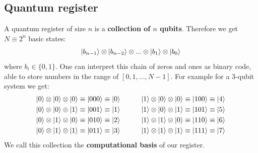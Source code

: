 \documentclass[bibliography=totocnumbered]{article}
\theoremstyle{NoticeStyle}
\begin{document}
\subsection{Quantum register}\label{sec:Quantum register}
A quantum register of size $n$ is a \textbf{collection of $n$ qubits}. Therefore we get $N \equiv 2^n$ basic states:
%
\begin{align}
	\ket{b_{n-1}} \otimes \ket{b_{n-2}} \otimes ... \otimes \ket{b_1} \otimes \ket{b_0}
\end{align}
%
where $b_i \in \{0, 1\}$. One can interpret this chain of zeros and ones as binary code, able to store numbers in the range of $[0, 1, ..., N-1]$. For example for a 3-qubit system we get:
%
\begin{align*}
	\ket{0} \otimes \ket{0} \otimes \ket{0} \equiv \ket{000} \equiv \ket{0} \quad\quad\quad
	\ket{1} \otimes \ket{0} \otimes \ket{0} \equiv \ket{100} \equiv \ket{4}\\
	\ket{0} \otimes \ket{0} \otimes \ket{1} \equiv \ket{001} \equiv \ket{1} \quad\quad\quad
	\ket{1} \otimes \ket{0} \otimes \ket{1} \equiv \ket{101} \equiv \ket{5}\\
	\ket{0} \otimes \ket{1} \otimes \ket{0} \equiv \ket{010} \equiv \ket{2} \quad\quad\quad
	\ket{1} \otimes \ket{1} \otimes \ket{0} \equiv \ket{110} \equiv \ket{6}\\
	\ket{0} \otimes \ket{1} \otimes \ket{1} \equiv \ket{011} \equiv \ket{3} \quad\quad\quad
	\ket{1} \otimes \ket{1} \otimes \ket{1} \equiv \ket{111} \equiv \ket{7}
\end{align*}
%
We call this collection the \textbf{computational basis} of our register.
\end{document}
